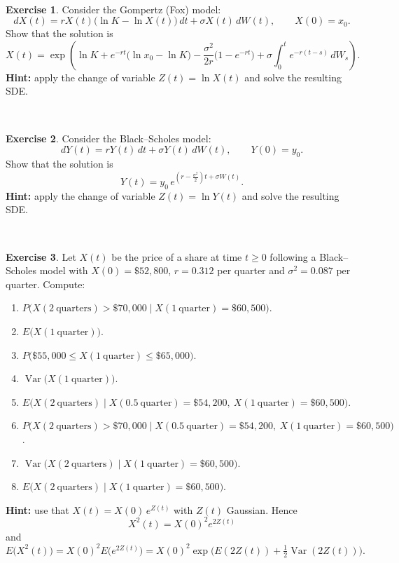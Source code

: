 \documentclass[
  11pt,
  a4paper,
]{book}
\theoremstyle{definition}
\theoremstyle{definition}
\theoremstyle{definition}
\newtheorem{exercise}{Exercise}[chapter]
\theoremstyle{definition}
\theoremstyle{remark}
\begin{document}
\(\,\)

\begin{exercise}
Consider the Gompertz (Fox) model:
\[
dX(t) = rX(t)\big(\ln K - \ln X(t)\big)\,dt + \sigma X(t)\,dW(t), \qquad X(0)=x_0.
\]
Show that the solution is
\[
X(t)=\exp\!\left(
   \ln K 
   + e^{-r t}\big(\ln x_0-\ln K\big) 
   - \frac{\sigma^2}{2r}\big(1-e^{-r t}\big) 
   + \sigma\int_0^t e^{-r (t-s)}\,dW_s
\right).
\]
\textbf{Hint:} apply the change of variable \(Z(t)=\ln X(t)\) and solve the resulting SDE.
\end{exercise}

\(\,\)

\begin{exercise}
Consider the Black--Scholes model:
\[
dY(t) = rY(t)\,dt + \sigma Y(t)\,dW(t), \qquad Y(0)=y_0.
\]
Show that the solution is
\[
Y(t) = y_0\, e^{\left(r - \tfrac{\sigma^2}{2}\right)t + \sigma W(t)}.
\]
\textbf{Hint:} apply the change of variable \(Z(t) = \ln Y(t)\) and solve the resulting SDE.
\end{exercise}

\(\,\)

\begin{exercise}
Let \(X(t)\) be the price of a share at time \(t\ge0\) following a Black--Scholes model with \(X(0)=\$52{,}800\), \(r=0.312\) per quarter and \(\sigma^2 = 0.087\) per quarter. Compute:

\begin{enumerate}
\def\labelenumi{(\alph{enumi})}
\item
  \(P\big(X(2\ \text{quarters}) > \$70{,}000 \mid X(1\ \text{quarter}) = \$60{,}500\big)\).
\item
  \(E\big(X(1\ \text{quarter})\big)\).
\item
  \(P\big(\$55{,}000 \le X(1\ \text{quarter}) \le \$65{,}000\big)\).
\item
  \(\operatorname{Var}\big(X(1\ \text{quarter})\big)\).
\item
  \(E\big(X(2\ \text{quarters}) \mid X(0.5\ \text{quarter}) = \$54{,}200,\ X(1\ \text{quarter}) = \$60{,}500\big)\).
\item
  \(P\big(X(2\ \text{quarters}) > \$70{,}000 \mid X(0.5\ \text{quarter}) = \$54{,}200,\ X(1\ \text{quarter}) = \$60{,}500\big)\).
\item
  \(\operatorname{Var}\big(X(2\ \text{quarters}) \mid X(1\ \text{quarter}) = \$60{,}500\big)\).
\item
  \(E\big(X(2\ \text{quarters}) \mid X(1\ \text{quarter}) = \$60{,}500\big)\).
\end{enumerate}

\textbf{Hint:} use that \(X(t) = X(0)\,e^{Z(t)}\) with \(Z(t)\) Gaussian. Hence
\[
X^2(t) = X(0)^2 e^{2Z(t)}
\]
and
\[
E\big(X^2(t)\big) = X(0)^2 E\!\big(e^{2Z(t)}\big) = X(0)^2 \exp\!\big( E(2Z(t)) + \tfrac{1}{2}\operatorname{Var}(2Z(t)) \big).
\]
\end{exercise}
\end{document}
